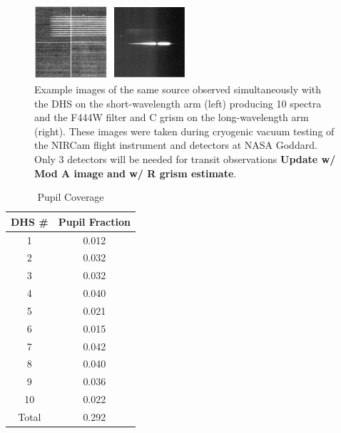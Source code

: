 \documentclass[iop]{emulateapj}
\begin{document}
\begin{figure}[!ht]
\includegraphics[width=0.5\textwidth]{dhs_image_example.png}
\caption{Example images of the same source observed simultaneously with the DHS on the short-wavelength arm (left) producing 10 spectra and the F444W filter and C grism on the long-wavelength arm (right).
These images were taken during cryogenic vacuum testing of the NIRCam flight instrument and detectors at NASA Goddard.
Only 3 detectors will be needed for transit observations \textbf{Update w/ Mod A image and w/ R grism estimate}.}\label{fig:DHSimage}
\end{figure}

\begin{table}
\centering
\begin{tabular}{cc}
DHS \# & Pupil Fraction \\
\hline \hline
1 & 0.012 \\
2 & 0.032 \\
3 &  0.032 \\
4 & 0.040 \\
5 & 0.021 \\
6 & 0.015 \\
7 & 0.042 \\
8 & 0.040 \\
9 & 0.036 \\
10 & 0.022 \\
\hline
Total & 0.292
\end{tabular}
\caption{Pupil Coverage}\label{tab:pupfrac}
\label{tab:pupfrac}
\end{table}
\end{document}
